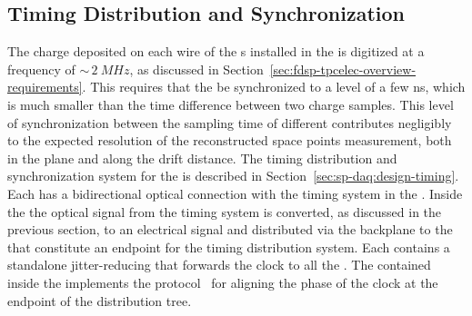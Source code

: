 \subsection{Timing Distribution and Synchronization}
\label{sec:fdsp-tpcelec-design-timing}

The charge deposited on each wire of the s installed 
in the   is digitized at a frequency of
$\sim\,\SI{2}{MHz}$, as discussed in 
Section~\ref{sec:fdsp-tpcelec-overview-requirements}. This requires
that the  be synchronized to a level of a few ns, which is
much smaller than the time difference between two charge samples.
This level of synchronization between the sampling time of different
 contributes negligibly %
to the expected
resolution %
of the reconstructed space points measurement,
both in the  plane and along the drift distance.
The timing distribution and synchronization system for the %
 is described in Section~\ref{sec:sp-daq:design-timing}.
Each  has a bidirectional optical connection with the
timing system in the . Inside the  the optical
signal from the timing system is converted, as discussed in the previous
section, to an electrical signal and distributed via the backplane to
the  that constitute an endpoint for the timing distribution
system. Each  contains a standalone jitter-reducing  
that %
forwards the clock to all the . The
 contained inside the  implements the 
protocol~\cite{bib:docdb1651,bib:docdb11233}%
for aligning
the phase of the clock at the endpoint of the distribution tree.

